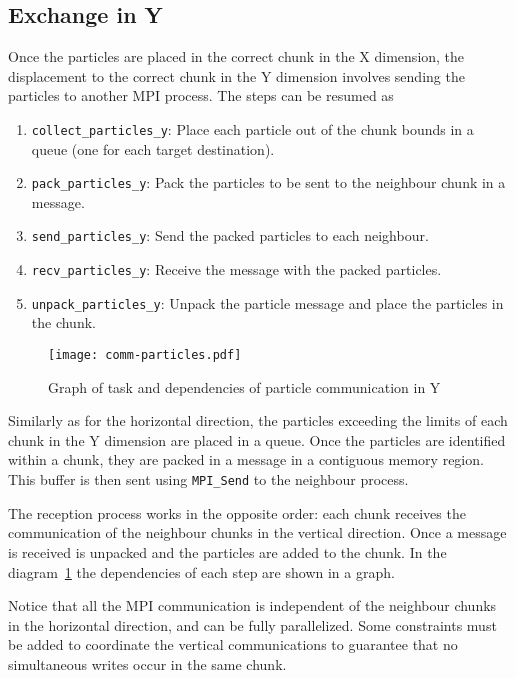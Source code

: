 \subsection{Exchange in Y}
Once the particles are placed in the correct chunk in the X dimension, the 
displacement to the correct chunk in the Y dimension involves sending the 
particles to another MPI process. The steps can be resumed as
%
\begin{enumerate}
\item \texttt{collect\_particles\_y}: Place each particle out of the chunk 
bounds in a queue (one for each target destination).
\item \texttt{pack\_particles\_y}: Pack the particles to be sent to the 
neighbour chunk in a message.
\item \texttt{send\_particles\_y}: Send the packed particles to each neighbour.
\item \texttt{recv\_particles\_y}: Receive the message with the packed 
particles.
\item \texttt{unpack\_particles\_y}: Unpack the particle message and place the 
particles in the chunk.
\end{enumerate}
%
\begin{figure}
\centering
\texttt{[image: comm-particles.pdf]}
\caption{Graph of task and dependencies of particle communication in 
Y}
\label{fig:comm_y}
\end{figure}
%
Similarly as for the horizontal direction, the particles exceeding the limits of 
each chunk in the Y dimension are placed in a queue.  Once the particles are 
identified within a chunk, they are packed in a message in a contiguous memory 
region. This buffer is then sent using \texttt{MPI\_Send} to the neighbour 
process.

The reception process works in the opposite order: each chunk receives the 
communication of the neighbour chunks in the vertical direction. Once a message 
is received is unpacked and the particles are added to the chunk. In the 
diagram~\ref{fig:comm_y} the dependencies of each step are shown in a graph.

Notice that all the MPI communication is independent of the neighbour chunks in 
the horizontal direction, and can be fully parallelized. Some constraints must 
be added to coordinate the vertical communications to guarantee that no 
simultaneous writes occur in the same chunk.

